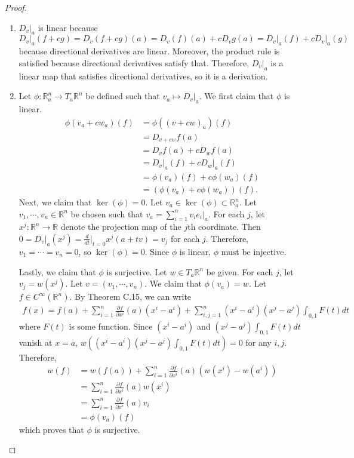 \begin{proof}
  $ $
  \begin{enumerate}[label=(\alph*)]
    \item 
      $D_v\vert_a$ is linear because $D_v\vert_a(f + cg) = D_v(f + cg)(a) = D_v(f)(a) + cD_vg(a) = D_v\vert_a(f) + cD_v\vert_a(g)$ because directional derivatives are linear.
      Moreover, the product rule is satisfied because directional derivatives satisfy that.
      Therefore, $D_v\vert_a$ is a linear map that satisfies directional derivatives, so it is a derivation.
    \item
      Let $\phi: \mathbb{R}^n_a \rightarrow T_a\mathbb{R}^n$ be defined such that $v_a \mapsto D_v\vert_a$.
      We first claim that $\phi$ is linear.
      \begin{align*}
        \phi(v_a + cw_a)(f)
          &= \phi((v + cw)_a)(f) \\
          &= D_{v + cw}f(a) \\
          &= D_vf(a) + cD_wf(a) \\
          &= D_v\vert_a(f) + cD_w\vert_a(f) \\
          &= \phi(v_a)(f) + c\phi(w_a)(f) \\
          &= (\phi(v_a) + c\phi(w_a))(f).
      \end{align*}
      Next, we claim that $\ker(\phi) = 0$.
      Let $v_a \in \ker(\phi) \subset \mathbb{R}^n_a$.
      Let $v_1, \cdots, v_n \in \mathbb{R}^n$ be chosen such that $v_a = \sum_{i=1}^{n} v_ie_i\vert_a$.
      For each $j$, let $x^j: \mathbb{R}^n \rightarrow \mathbb{R}$ denote the projection map of the $j$th coordinate.
      Then $0 = D_v\vert_a(x^j) = \frac{d}{dt}\vert_{t = 0}x^j(a + tv) = v_j$ for each $j$.
      Therefore, $v_1 = \cdots = v_n = 0$, so $\ker(\phi) = 0$.
      Since $\phi$ is linear, $\phi$ must be injective.

      Lastly, we claim that $\phi$ is surjective.
      Let $w \in T_a\mathbb{R}^n$ be given.
      For each $j$, let $v_j = w(x^j)$.
      Let $v = (v_1, \cdots, v_n)$.
      We claim that $\phi(v_a) = w$.
      Let $f \in C^{\infty}(\mathbb{R}^n)$.
      By Theorem C.15, we can write
      \begin{align*}
        f(x) = f(a) + \sum_{i=1}^{n} \frac{\partial f}{\partial x^i}(a)(x^i - a^i) + \sum_{i, j = 1}^{n} (x^i - a^i)(x^j - a^j) \int_{0, 1} F(t) dt
      \end{align*}
      where $F(t)$ is some function.
      Since $(x^i - a^i)$ and $(x^j - a^j)\int_{0, 1} F(t)dt$ vanish at $x = a$, $w((x^i - a^i)(x^j - a^j) \int_{0, 1} F(t) dt) = 0$ for any $i, j$.
      Therefore, 
      \begin{align*}
        w(f)
          &= w(f(a)) + \sum_{i=1}^{n} \frac{\partial f}{\partial x^i}(a)(w(x^i) - w(a^i)) \\
          &= \sum_{i=1}^{n} \frac{\partial f}{\partial x^i}(a)w(x^i) \\
          &= \sum_{i=1}^{n} \frac{\partial f}{\partial x^i}(a)v_i \\
          &= \phi(v_a)(f)
      \end{align*}
      which proves that $\phi$ is surjective.
  \end{enumerate}
\end{proof}

